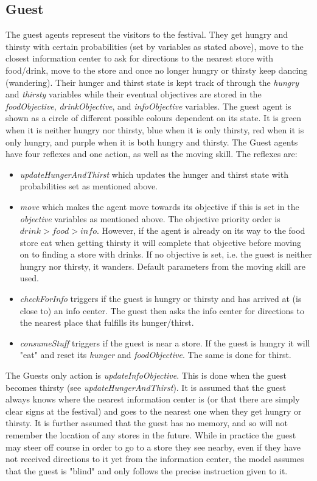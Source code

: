\documentclass[a4paper]{article}
\begin{document}
\subsection{Guest}
The guest agents represent the visitors to the festival. They get hungry and thirsty with certain probabilities (set by variables as stated above), move to the closest information center to ask for directions to the nearest store with food/drink, move to the store and once no longer hungry or thirsty keep dancing (wandering). Their hunger and thirst state is kept track of through the \textit{hungry} and \textit{thirsty} variables while their eventual objectives are stored in the \textit{foodObjective}, \textit{drinkObjective}, and \textit{infoObjective} variables. The guest agent is shown as a circle of different possible colours dependent on its state. It is green when it is neither hungry nor thirsty, blue when it is only thirsty, red when it is only hungry, and purple when it is both hungry and thirsty.
The Guest agents have four reflexes and one action, as well as the moving skill. The reflexes are:
\begin{itemize}
    \item \textit{updateHungerAndThirst} which updates the hunger and thirst state with probabilities set as mentioned above.
    \item \textit{move} which makes the agent move towards its objective if this is set in the \textit{objective} variables as mentioned above. The objective priority order is $drink > food > info$. However, if the agent is already on its way to the food store eat when getting thirsty it will complete that objective before moving on to finding a store with drinks. If no objective is set, i.e. the guest is neither hungry nor thirsty, it wanders. Default parameters from the moving skill are used.
    \item \textit{checkForInfo} triggers if the guest is hungry or thirsty and has arrived at (is close to) an info center. The guest then asks the info center for directions to the nearest place that fulfills its hunger/thirst.
    \item \textit{consumeStuff} triggers if the guest is near a store. If the guest is hungry it will "eat" and reset its \textit{hunger} and \textit{foodObjective}. The same is done for thirst. 
\end{itemize}
The Guests only action is \textit{updateInfoObjective}. This is done when the guest becomes thirsty (see \textit{updateHungerAndThirst}). It is assumed that the guest always knows where the nearest information center is (or that there are simply clear signs at the festival) and goes to the nearest one when they get hungry or thirsty. It is further assumed that the guest has no memory, and so will not remember the location of any stores in the future. While in practice the guest may steer off course in order to go to a store they see nearby, even if they have not received directions to it yet from the information center, the model assumes that the guest is "blind" and only follows the precise instruction given to it.
\end{document}
